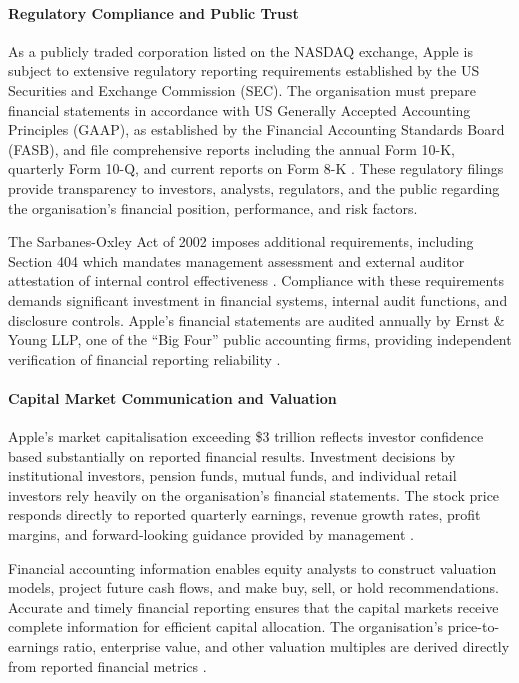 \documentclass[12pt,a4paper]{article}
\begin{document}
\paragraph{Regulatory Compliance and Public Trust}

As a publicly traded corporation listed on the NASDAQ exchange, Apple is subject to extensive regulatory reporting requirements established by the US Securities and Exchange Commission (SEC). The organisation must prepare financial statements in accordance with US Generally Accepted Accounting Principles (GAAP), as established by the Financial Accounting Standards Board (FASB), and file comprehensive reports including the annual Form 10-K, quarterly Form 10-Q, and current reports on Form 8-K \citep{fasb2024, sec2024}. These regulatory filings provide transparency to investors, analysts, regulators, and the public regarding the organisation's financial position, performance, and risk factors.

The Sarbanes-Oxley Act of 2002 imposes additional requirements, including Section 404 which mandates management assessment and external auditor attestation of internal control effectiveness \citep{sox2002}. Compliance with these requirements demands significant investment in financial systems, internal audit functions, and disclosure controls. Apple's financial statements are audited annually by Ernst \& Young LLP, one of the ``Big Four'' public accounting firms, providing independent verification of financial reporting reliability \citep{apple202410k}.

\paragraph{Capital Market Communication and Valuation}

Apple's market capitalisation exceeding \$3 trillion reflects investor confidence based substantially on reported financial results. Investment decisions by institutional investors, pension funds, mutual funds, and individual retail investors rely heavily on the organisation's financial statements. The stock price responds directly to reported quarterly earnings, revenue growth rates, profit margins, and forward-looking guidance provided by management \citep{brealey2020}.

Financial accounting information enables equity analysts to construct valuation models, project future cash flows, and make buy, sell, or hold recommendations. Accurate and timely financial reporting ensures that the capital markets receive complete information for efficient capital allocation. The organisation's price-to-earnings ratio, enterprise value, and other valuation multiples are derived directly from reported financial metrics \citep{kieso2023}.
\end{document}
